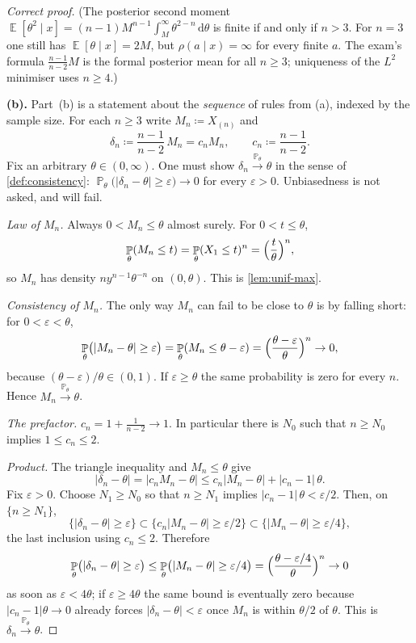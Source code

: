 \documentclass[11pt,a4paper]{article}
\DeclareMathOperator{\E}{\mathbb{E}}
\DeclareMathOperator{\Pbb}{\mathbb{P}}
\begin{document}
\begin{proof}[Correct proof]
(The posterior second moment \( \E[\theta^{2}\mid x]=(n-1)M^{n-1}\int_{M}^{\infty}\theta^{2-n}\,\mathrm{d}\theta \) is finite if and only if \( n>3 \). For \( n=3 \) one still has \( \E[\theta\mid x]=2M \), but \( \rho(a\mid x)=\infty \) for every finite \( a \). The exam's formula \( \frac{n-1}{n-2}M \) is the formal posterior mean for all \( n\ge 3 \); uniqueness of the \( L^{2} \) minimiser uses \( n\ge 4 \).)

\textbf{(b).}
Part~(b) is a statement about the \emph{sequence} of rules from (a), indexed by the sample size. For each \( n\ge 3 \) write \( M_n\coloneqq X_{(n)} \) and
\[
\delta_n
\coloneqq
\frac{n-1}{n-2}\,M_n
=
c_n M_n,
\qquad
c_n
\coloneqq
\frac{n-1}{n-2}.
\]
Fix an arbitrary \( \theta\in(0,\infty) \). One must show \( \delta_n\xrightarrow{\Pbb_\theta}\theta \) in the sense of \cref{def:consistency}: \( \Pbb_\theta\bigl(|\delta_n-\theta|\ge\varepsilon\bigr)\to 0 \) for every \( \varepsilon>0 \). Unbiasedness is not asked, and will fail.

\emph{Law of \( M_n \).}
Always \( 0<M_n\le\theta \) almost surely. For \( 0<t\le\theta \),
\[
\Pbb_\theta(M_n\le t)
=
\Pbb_\theta(X_1\le t)^{n}
=
\Bigl(\frac{t}{\theta}\Bigr)^{n},
\]
so \( M_n \) has density \( n y^{n-1}\theta^{-n} \) on \( (0,\theta) \). This is \cref{lem:unif-max}.

\emph{Consistency of \( M_n \).}
The only way \( M_n \) can fail to be close to \( \theta \) is by falling short: for \( 0<\varepsilon<\theta \),
\[
\Pbb_\theta\bigl(|M_n-\theta|\ge\varepsilon\bigr)
=
\Pbb_\theta(M_n\le\theta-\varepsilon)
=
\Bigl(\frac{\theta-\varepsilon}{\theta}\Bigr)^{n}
\to 0,
\]
because \( (\theta-\varepsilon)/\theta\in(0,1) \). If \( \varepsilon\ge\theta \) the same probability is zero for every \( n \). Hence \( M_n\xrightarrow{\Pbb_\theta}\theta \).

\emph{The prefactor.}
\( c_n=1+\frac{1}{n-2}\to 1 \). In particular there is \( N_0 \) such that \( n\ge N_0 \) implies \( 1\le c_n\le 2 \).

\emph{Product.}
The triangle inequality and \( M_n\le\theta \) give
\[
\bigl|\delta_n-\theta\bigr|
=
\bigl|c_n M_n-\theta\bigr|
\le
c_n\bigl|M_n-\theta\bigr|
+
\bigl|c_n-1\bigr|\,\theta.
\]
Fix \( \varepsilon>0 \). Choose \( N_1\ge N_0 \) so that \( n\ge N_1 \) implies \( |c_n-1|\,\theta<\varepsilon/2 \). Then, on \( \{n\ge N_1\} \),
\[
\bigl\{\bigl|\delta_n-\theta\bigr|\ge\varepsilon\bigr\}
\subset
\bigl\{c_n\bigl|M_n-\theta\bigr|\ge\varepsilon/2\bigr\}
\subset
\bigl\{\bigl|M_n-\theta\bigr|\ge\varepsilon/4\bigr\},
\]
the last inclusion using \( c_n\le 2 \). Therefore
\[
\Pbb_\theta\bigl(|\delta_n-\theta|\ge\varepsilon\bigr)
\le
\Pbb_\theta\bigl(|M_n-\theta|\ge\varepsilon/4\bigr)
=
\Bigl(\frac{\theta-\varepsilon/4}{\theta}\Bigr)^{n}
\to 0
\]
as soon as \( \varepsilon<4\theta \); if \( \varepsilon\ge 4\theta \) the same bound is eventually zero because \( |c_n-1|\theta\to 0 \) already forces \( |\delta_n-\theta|<\varepsilon \) once \( M_n \) is within \( \theta/2 \) of \( \theta \). This is \( \delta_n\xrightarrow{\Pbb_\theta}\theta \).


\end{proof}
\end{document}
